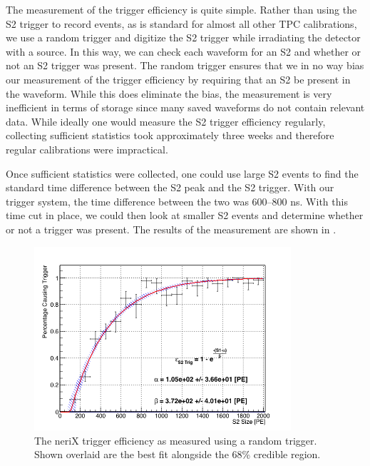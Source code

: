 The measurement of the trigger efficiency is quite simple.  Rather than using the S2 trigger to record events, as is standard for almost all other TPC calibrations, we use a random trigger and digitize the S2 trigger while irradiating the detector with a \sodium{} source.  In this way, we can check each waveform for an S2 and whether or not an S2 trigger was present.  The random trigger ensures that we in no way bias our measurement of the trigger efficiency by requiring that an S2 be present in the waveform.  While this does eliminate the bias, the measurement is very inefficient in terms of storage since many saved waveforms do not contain relevant data.  While ideally one would measure the S2 trigger efficiency regularly, collecting sufficient statistics took approximately three weeks and therefore regular calibrations were impractical.

Once sufficient statistics were collected, one could use large S2 events to find the standard time difference between the S2 peak and the S2 trigger.  With our trigger system, the time difference between the two was 600--800 ns.  With this time cut in place, we could then look at smaller S2 events and determine whether or not a trigger was present.  The results of the measurement are shown in .

\begin{figure}[t]
        \centering
	\includegraphics[width=0.85\textwidth]{nerix_trigger_efficiency}
	\caption{The neriX trigger efficiency as measured using a random trigger.  Shown overlaid are the best fit alongside the 68\% credible region.}
	\label{fig:nerix_trigger_efficiency}
\end{figure}



